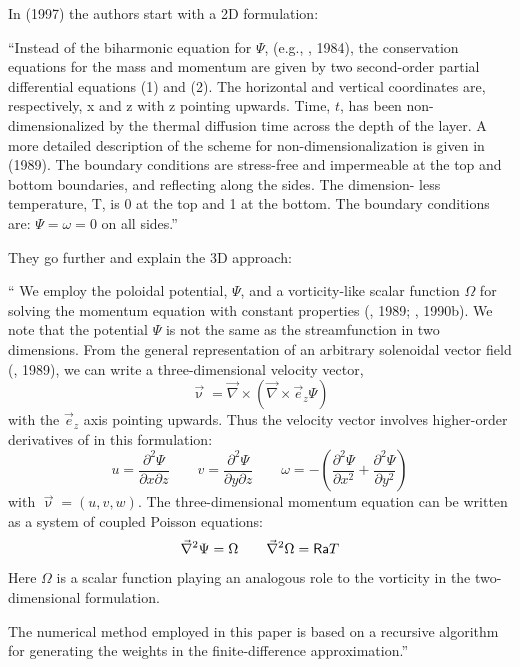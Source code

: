 \noindent In \textcite{laym97} (1997) the authors start with a 2D formulation:
\begin{displayquote}
{\color{darkgray}
``Instead of the biharmonic equation for $\Psi$, (e.g., \textcite{chri84}, 1984), the conservation equations for the mass and momentum are given by two 
second-order partial differential equations (1) and (2). The horizontal and vertical coordinates are, respectively, x and z with z pointing upwards. Time, $t$, has been
non-dimensionalized by the thermal diffusion time across the depth of
the layer. A more detailed description of the scheme for non-dimensionalization is given in \textcite{weoy89} (1989).
The boundary conditions are stress-free and impermeable at the top
and bottom boundaries, and reflecting along the sides. The dimension-
less temperature, T, is 0 at the top and 1 at the bottom. The boundary
conditions are: $\Psi=\omega=0$ on all sides.''
}
\end{displayquote}
They go further and explain the 3D approach:
\begin{displayquote}
{\color{darkgray}
``
We employ the poloidal potential, $\Psi$, and a vorticity-like scalar function 
$\Omega$ for solving the momentum equation with constant properties
(\textcite{buss89}, 1989; \textcite{tros90}, 1990b). 
We note that the potential $\Psi$ is not
the same as the streamfunction in two dimensions. From the general
representation of an arbitrary solenoidal vector field (\textcite{buss89}, 1989), we
can write a three-dimensional velocity vector,
\[
\vec\upnu = \vec\nabla \times ( \vec\nabla \times \vec{e}_z\Psi  )
\]
with the $\vec{e}_z$ axis pointing upwards. Thus the velocity vector involves
higher-order derivatives of in this formulation:
\[
u=\frac{\partial^2 \Psi}{\partial x\partial z}
\qquad
v=\frac{\partial^2 \Psi}{\partial y\partial z}
\qquad
\omega = -
\left(
\frac{\partial^2\Psi }{\partial x^2}
+\frac{\partial^2\Psi }{\partial y^2}
\right)
\]
with $\vec\upnu=(u, v, w)$. The three-dimensional momentum equation can be
written as a system of coupled Poisson equations:
\[
\vec\nabla^2 \Psi = \Omega  
\qquad
\vec\nabla^2 \Omega = {\mathsf{Ra}} T 
\]
Here $\Omega$ is a scalar function playing an analogous role to the vorticity
in the two-dimensional formulation.

The numerical method employed in this paper is based on a recursive
algorithm for generating the weights in the finite-difference approximation.''}
\end{displayquote}

